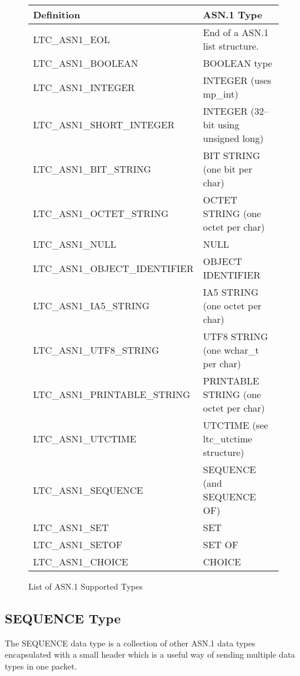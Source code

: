 \documentclass[synpaper]{book}
\begin{document}
\begin{figure}[here]
\begin{center}
\begin{small}
\begin{tabular}{|l|l|}
\hline \textbf{Definition}           & \textbf{ASN.1 Type} \\
\hline LTC\_ASN1\_EOL                & End of a ASN.1 list structure. \\
\hline LTC\_ASN1\_BOOLEAN            & BOOLEAN type \\
\hline LTC\_ASN1\_INTEGER            & INTEGER (uses mp\_int) \\
\hline LTC\_ASN1\_SHORT\_INTEGER     & INTEGER (32--bit using unsigned long) \\
\hline LTC\_ASN1\_BIT\_STRING        & BIT STRING (one bit per char) \\
\hline LTC\_ASN1\_OCTET\_STRING      & OCTET STRING (one octet per char) \\
\hline LTC\_ASN1\_NULL               & NULL \\
\hline LTC\_ASN1\_OBJECT\_IDENTIFIER & OBJECT IDENTIFIER  \\
\hline LTC\_ASN1\_IA5\_STRING        & IA5 STRING (one octet per char) \\
\hline LTC\_ASN1\_UTF8\_STRING       & UTF8 STRING (one wchar\_t per char) \\
\hline LTC\_ASN1\_PRINTABLE\_STRING  & PRINTABLE STRING (one octet per char) \\
\hline LTC\_ASN1\_UTCTIME            & UTCTIME (see ltc\_utctime structure) \\
\hline LTC\_ASN1\_SEQUENCE           & SEQUENCE (and SEQUENCE OF) \\
\hline LTC\_ASN1\_SET                & SET \\
\hline LTC\_ASN1\_SETOF              & SET OF \\
\hline LTC\_ASN1\_CHOICE             & CHOICE \\
\hline
\end{tabular}
\caption{List of ASN.1 Supported Types}
\end{small}
\end{center}
\end{figure}

\subsection{SEQUENCE Type}
The SEQUENCE data type is a collection of other ASN.1 data types encapsulated with a small header which is a useful way of sending multiple data types in one packet.
\end{document}

